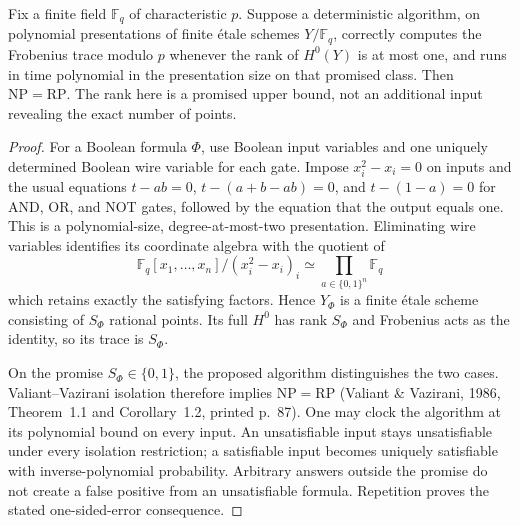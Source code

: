 \begin{proposition}
Fix a finite field $\mathbb F_q$ of characteristic $p$.
Suppose a deterministic algorithm, on polynomial presentations of finite
\'etale schemes $Y/\mathbb F_q$, correctly computes the Frobenius
trace modulo $p$ whenever the rank of $H^0(Y)$ is at most one,
and runs in time polynomial in the presentation size on that
promised class.  Then $\mathrm{NP}=\mathrm{RP}$.
The rank here is a promised upper bound, not an additional
input revealing the exact number of points.
\end{proposition}
\begin{proof}
For a Boolean formula $\Phi$, use Boolean input variables and
one uniquely determined Boolean wire variable for each gate.
Impose $x_i^2-x_i=0$ on inputs and the usual equations
$t-ab=0$, $t-(a+b-ab)=0$, and $t-(1-a)=0$ for AND, OR, and
NOT gates, followed by the equation that the output equals one.
This is a polynomial-size, degree-at-most-two presentation.
Eliminating wire variables identifies its coordinate algebra
with the quotient of
\[
 \mathbb F_q[x_1,\ldots,x_n]/(x_i^2-x_i)_i
       \simeq\prod_{a\in\{0,1\}^n}\mathbb F_q
\]
which retains exactly the satisfying factors.  Hence $Y_\Phi$
is a finite \'etale scheme consisting of $S_\Phi$ rational points.
Its full $H^0$ has rank $S_\Phi$ and Frobenius acts as the
identity, so its trace is $S_\Phi$.

On the promise $S_\Phi\in\{0,1\}$, the proposed algorithm
distinguishes the two cases.  Valiant--Vazirani isolation
therefore implies $\mathrm{NP}=\mathrm{RP}$ (Valiant \& Vazirani,
1986, Theorem~1.1 and Corollary~1.2, printed p.~87).
One may clock the algorithm at its polynomial bound on every
input.  An unsatisfiable input stays unsatisfiable under every
isolation restriction; a satisfiable input becomes uniquely
satisfiable with inverse-polynomial probability.  Arbitrary
answers outside the promise do not create a false positive
from an unsatisfiable formula.  Repetition proves the stated
one-sided-error consequence.
\end{proof}

